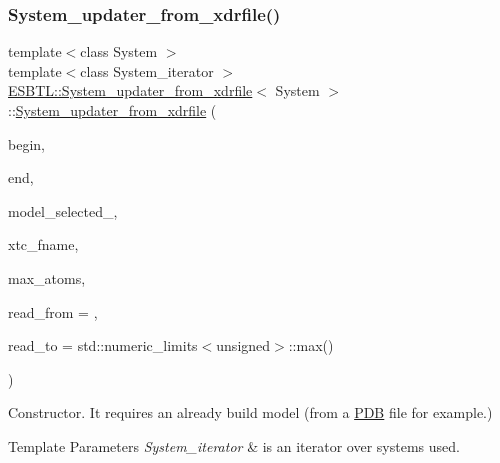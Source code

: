 \subsubsection{\texorpdfstring{System\+\_\+updater\+\_\+from\+\_\+xdrfile()}{System\_updater\_from\_xdrfile()}}
{\footnotesize\ttfamily template$<$class System $>$ \\
template$<$class System\+\_\+iterator $>$ \\
\hyperlink{classESBTL_1_1System__updater__from__xdrfile}{E\+S\+B\+T\+L\+::\+System\+\_\+updater\+\_\+from\+\_\+xdrfile}$<$ System $>$\+::\hyperlink{classESBTL_1_1System__updater__from__xdrfile}{System\+\_\+updater\+\_\+from\+\_\+xdrfile} (\begin{DoxyParamCaption}\item[{System\+\_\+iterator}]{begin,  }\item[{System\+\_\+iterator}]{end,  }\item[{unsigned}]{model\+\_\+selected\+\_\+,  }\item[{const std\+::string \&}]{xtc\+\_\+fname,  }\item[{unsigned}]{max\+\_\+atoms,  }\item[{unsigned}]{read\+\_\+from = {},  }\item[{unsigned}]{read\+\_\+to = {\ttfamily std\+:\+:numeric\+\_\+limits$<$unsigned$>$\+:\+:max()} }\end{DoxyParamCaption})\hspace{0.3cm}{\ttfamily [inline]}}

Constructor. It requires an already build model (from a \hyperlink{namespaceESBTL_1_1PDB}{P\+DB} file for example.) 
\begin{DoxyTemplParams}{Template Parameters}
{\em System\+\_\+iterator} & is an iterator over systems used. \\
\hline
\end{DoxyTemplParams}

